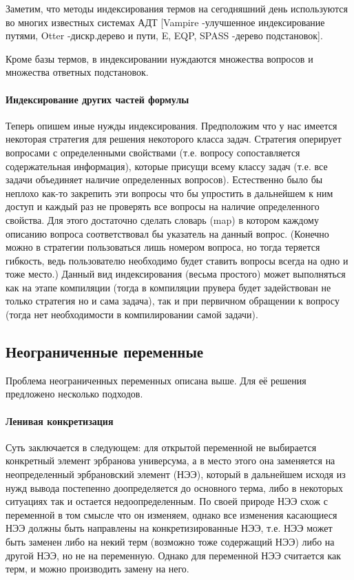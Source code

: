 Заметим, что методы индексирования термов на сегодняшний день используются во многих известных системах АДТ [Vampire -улучшенное индексирование путями, Otter -дискр.дерево и пути, E, EQP, SPASS -дерево подстановок].

Кроме базы термов, в индексировании нуждаются множества вопросов и множества ответных подстановок.

\paragraph{Индексирование других частей формулы}
Теперь опишем иные нужды индексирования. Предположим что у нас имеется некоторая стратегия для решения некоторого класса задач. Стратегия оперирует вопросами с определенными свойствами (т.е. вопросу сопоставляется содержательная информация), которые присущи всему классу задач (т.е. все задачи объединяет наличие определенных вопросов). 
Естественно было бы неплохо как-то закрепить эти вопросы что бы упростить в дальнейшем к ним доступ и каждый раз не проверять все вопросы на наличие определенного свойства. 
Для этого достаточно сделать словарь (map) в котором каждому описанию вопроса соответствовал бы указатель на данный вопрос. (Конечно можно в стратегии пользоваться лишь номером вопроса, но тогда теряется гибкость, ведь пользователю необходимо будет ставить вопросы всегда на одно и тоже место.) 
Данный вид индексирования (весьма простого) может выполняться как на этапе компиляции (тогда в компиляции прувера будет задействован не только стратегия но и сама задача), так и при первичном обращении к вопросу (тогда нет необходимости в компилировании самой задачи).


\subsection{Неограниченные переменные}
Проблема неограниченных переменных описана выше. Для её решения предложено несколько подходов.

\paragraph{Ленивая конкретизация}
Суть заключается в следующем: для открытой переменной не выбирается конкретный элемент эрбранова универсума, а в место этого она заменяется на неопределенный эрбрановский элемент (НЭЭ), который в дальнейшем исходя из нужд вывода постепенно доопределяется до основного терма, либо в некоторых ситуациях так и остается недоопределенным. 
По своей природе НЭЭ схож с переменной в том смысле что он изменяем, однако все изменения касающиеся НЭЭ должны быть направлены на конкретизированные НЭЭ, т.е. НЭЭ может быть заменен либо на некий терм (возможно тоже содержащий НЭЭ) либо на другой НЭЭ, но не на переменную. Однако для переменной НЭЭ считается как терм, и можно производить замену на него.

